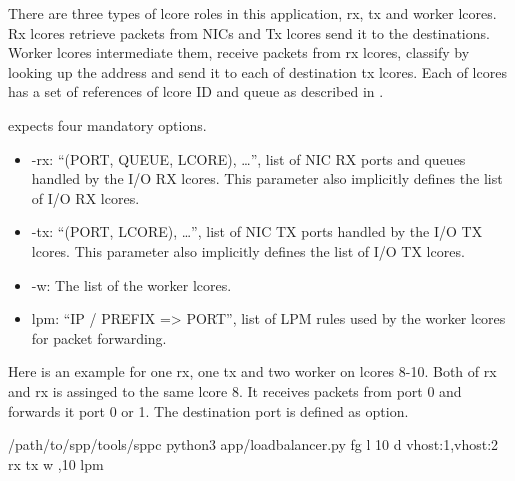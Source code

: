 \documentclass[a4paper,11pt,openany,oneside,english]{sphinxmanual}
\begin{document}
There are three types of lcore roles in this application, rx, tx and
worker lcores. Rx lcores retrieve packets from NICs and Tx lcores
send it to the destinations.
Worker lcores intermediate them, receive packets from rx lcores,
classify by looking up the address and send it to each of destination
tx lcores.
Each of lcores has a set of references of lcore ID and queue
as described in .

 expects four mandatory options.
\begin{itemize}
\item {} 
-rx: “(PORT, QUEUE, LCORE), …”, list of NIC RX ports and
queues handled by the I/O RX lcores. This parameter also implicitly
defines the list of I/O RX lcores.

\item {} 
-tx: “(PORT, LCORE), …”, list of NIC TX ports handled by
the I/O TX lcores. This parameter also implicitly defines the list
of I/O TX lcores.

\item {} 
-w: The list of the worker lcores.

\item {} 
\textendash{}lpm: “IP / PREFIX =\textgreater{} PORT”, list of LPM rules used by the worker
lcores for packet forwarding.

\end{itemize}

Here is an example for one rx, one tx and two worker on lcores 8-10.
Both of rx and rx is assinged to the same lcore 8.
It receives packets from port 0 and forwards it port 0 or 1.
The destination port is defined as  option.

\begin{sphinxVerbatim}[commandchars=\\\{\},formatcom=\footnotesize]
  /path/to/spp/tools/sppc
 python3 app/load\PYGZhy{}balancer.py \PYGZhy{}fg \PYGZhy{}l \PYGZhy{}10  \PYGZhy{}d vhost:1,vhost:2 
  \PYGZhy{}rx  \PYGZhy{}tx  \PYGZhy{}w ,10 
  \PYGZhy{}\PYGZhy{}lpm 
\end{sphinxVerbatim}
\end{document}
